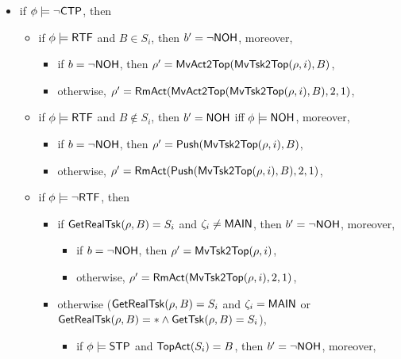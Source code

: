 {\begin{itemize}
\begin{itemize}
\begin{itemize}
\begin{itemize}
\begin{itemize}
						\begin{itemize}
							\item if $b = \neg \nohflag$, then $\rho'=\push(\mvtsktop(\rho, i), B)$,
							\item otherwise, $\rho' = \rmact(\push(\mvtsktop(\rho, i), B), 2, 1)$, 
						\end{itemize}
						\item if $\phi \models\neg{\sf CTP}$, then
						\begin{itemize}
							\item if $\phi \models {\sf RTF}$ and $B\in S_i$, then $b' = \neg {\sf NOH}$, moreover,
							\begin{itemize}
								\item if $b = \neg \nohflag$, then $\rho'=\mathsf{MvAct2Top}(\mathsf{MvTsk2Top}(\rho, i), B)$,
								\item otherwise, $\rho' = \mathsf{RmAct}(\mathsf{MvAct2Top}(\mathsf{MvTsk2Top}(\rho, i), B), 2, 1)$, 
							\end{itemize}
							\item if $\phi \models {\sf RTF}$ and $B\notin S_i$, then $b' = {\sf NOH}$ iff $\phi \models {\sf NOH}$, moreover, 
							\begin{itemize}
								\item if $b = \neg \nohflag$, then $\rho'=\push(\mvtsktop(\rho, i), B)$,
								\item otherwise, $\rho' = \rmact(\push(\mvtsktop(\rho, i), B), 2, 1)$, 
							\end{itemize}
							\item if $\phi \models \neg {\sf RTF}$, then
							\begin{itemize}
								\item if $\mathsf{GetRealTsk}(\rho,B) = S_i$ and $\zeta_i \neq {\sf MAIN}$, then $b' = \neg {\sf NOH}$, moreover,
								\begin{itemize}
									\item if $b = \neg \nohflag$, then $\rho'=\mathsf{MvTsk2Top}(\rho, i)$,
									\item otherwise, $\rho' = \mathsf{RmAct}(\mathsf{MvTsk2Top}(\rho, i), 2, 1)$, 
								\end{itemize}
								\item otherwise ($\mathsf{GetRealTsk}(\rho,B) = S_i$ and $\zeta_i = {\sf MAIN}$ or $\mathsf{GetRealTsk}(\rho,B) = * \wedge\mathsf{GetTsk}(\rho,B) = S_i$), 
								\begin{itemize}
									\item if $\phi\models{\sf STP}$ and $\mathsf{TopAct}(S_i) = B$, then $b' = \neg {\sf NOH}$, moreover,
									\begin{itemize}

\end{itemize}
\end{itemize}
\end{itemize}
\end{itemize}
\end{itemize}
\end{itemize}
\end{itemize}
\end{itemize}
\end{itemize}}
